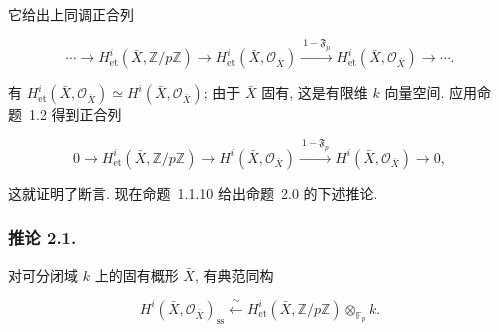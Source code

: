 它给出上同调正合列

\begin{equation}\tag{2.0.5}
\cdots\longrightarrow H^i_{\mathrm{et}}(\bar X,\mathbb Z/p\mathbb Z)
\longrightarrow H^i_{\mathrm{et}}(\bar X,\mathcal O_{\bar X})
\xrightarrow{\ 1-\mathfrak F_p\ }
H^i_{\mathrm{et}}(\bar X,\mathcal O_{\bar X})\longrightarrow\cdots .
\end{equation}

有 $H^i_{\mathrm{et}}(\bar X,\mathcal O_{\bar X})\simeq H^i(\bar X,\mathcal O_{\bar X})$;
由于 $\bar X$ 固有, 这是有限维 $k$ 向量空间. 应用命题~1.2 得到正合列

\begin{equation}\tag{2.0.6}
0\longrightarrow H^i_{\mathrm{et}}(\bar X,\mathbb Z/p\mathbb Z)
\longrightarrow H^i(\bar X,\mathcal O_{\bar X})
\xrightarrow{\ 1-\mathfrak F_p\ }
H^i(\bar X,\mathcal O_{\bar X})\longrightarrow0,
\end{equation}

这就证明了断言. 现在命题~1.1.10 给出命题~2.0 的下述推论.

\subsubsection*{推论 2.1.}
对可分闭域 $k$ 上的固有概形 $\bar X$, 有典范同构

\begin{equation}\tag{2.1.1}
H^i(\bar X,\mathcal O_{\bar X})_{\mathrm{ss}}
\xleftarrow{\ \sim\ }
H^i_{\mathrm{et}}(\bar X,\mathbb Z/p\mathbb Z)
\otimes_{\mathbb F_p}k.
\end{equation}
